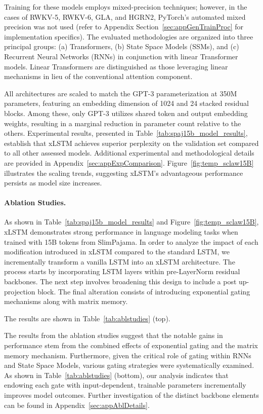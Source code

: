 Training for these models employs mixed-precision techniques; however, in the cases of RWKV-5, RWKV-6, GLA, and HGRN2, PyTorch’s automated mixed precision was not used (refer to Appendix Section~\ref{sec:appGenTrainProc} for implementation specifics). The evaluated methodologies are organized into three principal groups: (a) Transformers, (b) State Space Models (SSMs), and (c) Recurrent Neural Networks (RNNs) in conjunction with linear Transformer models. Linear Transformers are distinguished as those leveraging linear mechanisms in lieu of the conventional attention component.

All architectures are scaled to match the GPT-3 parameterization at 350M parameters, featuring an embedding dimension of 1024 and 24 stacked residual blocks. Among these, only GPT-3 utilizes shared token and output embedding weights, resulting in a marginal reduction in parameter count relative to the others. Experimental results, presented in Table~\ref{tab:spaj15b_model_results}, establish that xLSTM achieves superior perplexity on the validation set compared to all other assessed models. Additional experimental and methodological details are provided in Appendix~\ref{sec:appExpComparison}. Figure~\ref{fig:temp_sclaw15B} illustrates the scaling trends, suggesting xLSTM’s advantageous performance persists as model size increases.

\paragraph{Ablation Studies.}
As shown in Table~\ref{tab:spaj15b_model_results} and Figure~\ref{fig:temp_sclaw15B}, xLSTM demonstrates strong performance in language modeling tasks when trained with 15B tokens from SlimPajama. In order to analyze the impact of each modification introduced in xLSTM compared to the standard LSTM, we incrementally transform a vanilla LSTM into an xLSTM architecture. The process starts by incorporating LSTM layers within pre-LayerNorm residual backbones. The next step involves broadening this design to include a post up-projection block. The final alteration consists of introducing exponential gating mechanisms along with matrix memory.

The results are shown in Table~\ref{tab:ablstudies} (top). 

The results from the ablation studies suggest that the notable gains in performance stem from the combined effects of exponential gating and the matrix memory mechanism. Furthermore, given the critical role of gating within RNNs and State Space Models, various gating strategies were systematically examined. As shown in Table~\ref{tab:ablstudies} (bottom), our analysis indicates that endowing each gate with input-dependent, trainable parameters incrementally improves model outcomes. Further investigation of the distinct backbone elements can be found in Appendix~\ref{sec:appAblDetails}.

